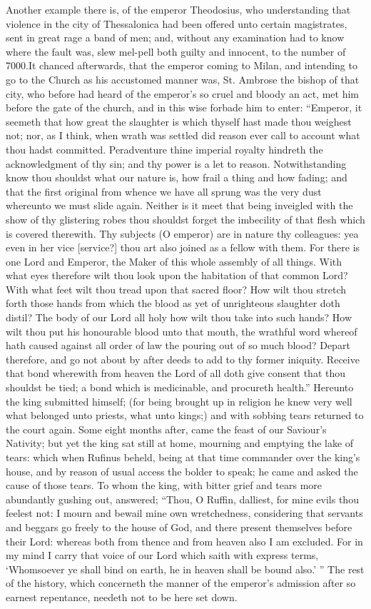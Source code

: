 Another example there is, of the emperor Theodosius, who understanding that violence in the city of Thessalonica had been offered unto certain magistrates, sent in great rage a band of men; and, without any examination had to know where the fault was, slew mel-pell both guilty and innocent, to the number of 7000.It chanced afterwards, that the  emperor coming to Milan, and intending to go to the Church as his accustomed manner was, St. Ambrose the bishop of that city, who before had heard of the emperor’s so cruel and bloody an act, met him before the gate of the church, and in this wise forbade him to enter: “Emperor, it seemeth that how great the slaughter is which thyself hast made thou weighest not; nor, as I think, when wrath was settled did reason ever call to account what thou hadst committed. Peradventure thine imperial royalty hindreth the acknowledgment of thy sin; and thy power is a let to reason. Notwithstanding know thou shouldst what our nature is, how frail a thing and how fading; and that the first original from whence we have all sprung was the very dust whereunto we must slide again. Neither is it meet that being inveigled with the show of thy glistering robes thou shouldst  forget the imbecility of that flesh which is covered therewith. Thy subjects (O emperor) are in nature thy colleagues: yea even in her vice [service?] thou art also joined as a fellow with them. For there is one Lord and Emperor, the Maker of this whole assembly of all things. With what eyes therefore wilt thou look upon the habitation of that common Lord? With what feet wilt thou tread upon that sacred floor? How wilt thou stretch forth those hands from which the blood as yet of unrighteous slaughter doth distil? The body of our Lord all holy how wilt thou take into such hands? How wilt thou put his honourable blood unto that mouth, the wrathful word whereof hath caused against all order of law the pouring out of so much blood? Depart therefore, and go not about by after deeds to add to thy former iniquity. Receive that bond wherewith from heaven the Lord of all doth give consent that thou shouldst be tied; a bond which is medicinable, and procureth health.” Hereunto the king submitted himself; (for being brought up in religion he knew very well what belonged unto priests, what unto kings;) and with sobbing tears returned to the court again. Some eight months after, came the feast of our Saviour’s Nativity; but yet the king sat still at home, mourning and emptying the lake of tears: which when Rufinus beheld, being at that time commander over the king’s house, and by reason of usual access the bolder to speak; he came and asked the cause of those tears. To whom the king, with bitter grief and tears more abundantly gushing out, answered; “Thou, O Ruffin, dalliest, for mine evils thou feelest not: I mourn and bewail mine own wretchedness, considering that servants and beggars go freely to the house of God, and there present themselves before their Lord: whereas both from thence and from heaven also I am excluded. For in my mind I carry that voice of our Lord which saith with express terms, ‘Whomsoever ye shall bind on earth, he in heaven shall be bound also.’ ” The rest of the history, which concerneth the manner of the emperor’s admission after so earnest repentance, needeth not to be here set down.

